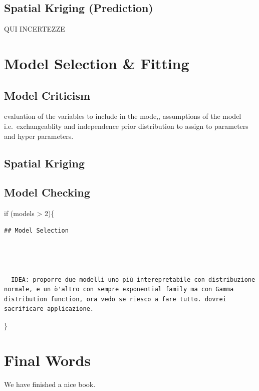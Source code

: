 \documentclass[
  12pt,
  a4paper,
  oneside]{book}
\theoremstyle{definition}
\theoremstyle{definition}
\theoremstyle{definition}
\theoremstyle{remark}
\begin{document}
\hypertarget{spatial-kriging-prediction}{%
\section{Spatial Kriging (Prediction)}\label{spatial-kriging-prediction}}

QUI INCERTEZZE

\hypertarget{modelspec}{%
\chapter{Model Selection \& Fitting}\label{modelspec}}

\hypertarget{model-criticism}{%
\section{Model Criticism}\label{model-criticism}}

evaluation of the variables to include in the mode,, assumptions of the model i.e.~exchangeablity and independence prior distribution to assign to parameters and hyper parameters.

\hypertarget{spatial-kriging-1}{%
\section{Spatial Kriging}\label{spatial-kriging-1}}

\hypertarget{model-checking-1}{%
\section{Model Checking}\label{model-checking-1}}

if (models \textgreater{} 2)\{

\begin{verbatim}
## Model Selection




  IDEA: proporre due modelli uno più interepretabile con distribuzione normale, e un ò'altro con sempre exponential family ma con Gamma distribution function, ora vedo se riesco a fare tutto. dovrei sacrificare applicazione.
\end{verbatim}

\}

\hypertarget{final-words}{%
\chapter{Final Words}\label{final-words}}

We have finished a nice book.
\end{document}
